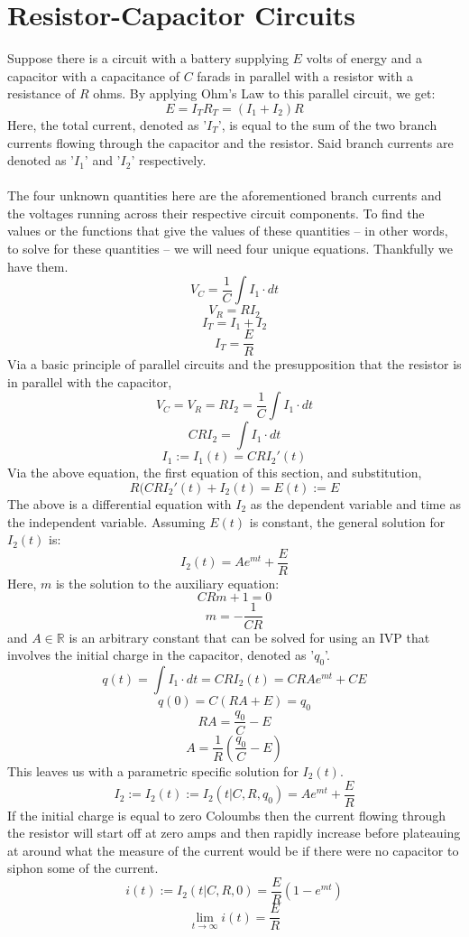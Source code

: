 \documentclass{article}
\begin{document}
	\section[RC-Circuit]{Resistor-Capacitor Circuits}
	Suppose there is a circuit with a battery supplying $E$ volts of energy and 
	a capacitor with a capacitance of $C$ farads in parallel with a resistor 
	with a resistance of $R$ ohms.  By applying Ohm's Law to this parallel 
	circuit, we get:
	$$ E=I_TR_T =(I_1+I_2)R$$
	Here, the total current, denoted as '$I_T$', is equal to the sum of the two 
	branch currents flowing through the capacitor and the resistor.  Said 
	branch currents are denoted as '$I_1$' and '$I_2$' respectively. \\ \\
	The four unknown quantities here are the aforementioned branch currents and 
	the voltages running across their respective circuit components.  To find 
	the 	values or the functions that give the values of these quantities -- 
	in other words, to solve for these quantities -- we will need four unique 
	equations.  Thankfully we have them.
	$$ V_C = \frac{1}{C}\int I_1 \cdot dt$$
	$$ V_R = RI_2$$
	$$ I_T = I_1 + I_2$$
	$$ I_T = \frac{E}{R}$$
	Via a basic principle of parallel circuits and the presupposition that the 
	resistor is in parallel with the capacitor,
	$$ V_C = V_R = RI_2 = \frac{1}{C} \int I_1 \cdot dt$$
	$$ CRI_2 = \int I_1 \cdot dt$$
	$$ I_1:=I_1(t) = CRI_2'(t)$$
	Via the above equation, the first equation of this section, and 
	substitution,
	$$ R(CRI_2'(t) + I_2(t) = E(t) := E$$
	The above is a differential equation with $I_2$ as the dependent variable 
	and time as the independent variable.  Assuming $E(t)$ is constant, the 
	general solution for $I_2(t)$ is:
	$$ I_2(t) = Ae^{mt} + \frac{E}{R}$$
	Here, $m$ is the solution to the auxiliary equation:
	$$ CRm + 1 = 0$$
	$$ m = - \frac{1}{CR}$$
	and $A \in \mathbb{R}$ is an arbitrary constant that can be solved for 
	using an IVP that involves the initial charge in the capacitor, denoted as 
	'$q_0$'.
	$$ q(t) = \int I_1 \cdot dt = CRI_2(t) = CRAe^{mt} + CE$$
	$$ q(0) = C(RA + E) = q_0$$
	$$ RA = \frac{q_0}{C} - E$$
	$$ A = \frac{1}{R}\left(\frac{q_0}{C}-E\right)$$
	This leaves us with a parametric specific solution for $I_2(t)$.
	$$ I_2 := I_2(t) := I_2(t \vert C, R, q_0) = Ae^{mt} + \frac{E}{R}$$
	If the initial charge is equal to zero Coloumbs then the current flowing 
	through the resistor will start off at zero amps and then rapidly increase 
	before plateauing at around what the measure of the current would be if 
	there were no capacitor to siphon some of the current.
	$$ i(t) := I_2(t \vert C, R, 0) = \frac{E}{R}(1-e^{mt})$$
	$$ \lim_{t \to \infty}i(t) = \frac{E}{R}$$
\end{document}
